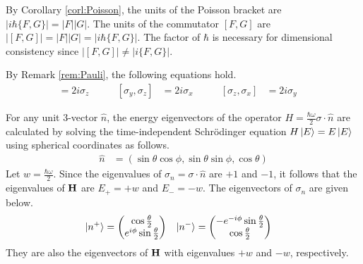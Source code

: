 \begin{answer}
	By Corollary \ref{corl:Poisson}, the units of the Poisson bracket are $\left|i \hbar \{F, G\}\right| = \left|F\right| \left|G\right|$.
	The units of the commutator $\left[F, G\right]$ are $\left|[F, G]\right| = |F| |G| = \left|i \hbar \{F, G\}\right|$.
	The factor of $\hbar$ is necessary for dimensional consistency since $\left|[F,G]\right| \neq \left|i \{F, G\}\right|$.
\end{answer}

\begin{answer}
	By Remark \ref{rem:Pauli}, the following equations hold.
	\begin{align*}
		[\sigma_x, \sigma_y] & = 2 i \sigma_z \qquad
		                     &
		[\sigma_y, \sigma_z] & = 2 i \sigma_x \qquad
		                     &
		[\sigma_z, \sigma_x] & = 2 i \sigma_y \qquad
	\end{align*}
\end{answer}

\begin{answer}
	For any unit $3$-vector $\hat{n}$, the energy eigenvectors of the operator $H = \frac{\hbar \omega}{2} \sigma \cdot \hat{n}$ are calculated by solving the time-independent Schr\"{o}dinger equation $H \ket{E} = E \ket{E}$ using spherical coordinates as follows.
	\begin{align}
		\hat{n} & = \left(\sin \theta \cos \phi, \sin \theta \sin \phi, \cos \theta\right)
	\end{align}
	Let $w = \frac{\hbar \omega}{2}$.
	Since the eigenvalues of $\sigma_n = \sigma \cdot \hat{n}$ are $+1$ and $-1$, it follows that the eigenvalues of $\mathbf{H}$ are $E_+ = +w$ and $E_- = -w$.
	The eigenvectors of $\sigma_n$ are given below.
	\begin{align*}
		\ket{n^+} & =
		\begin{pmatrix}
			\cos \frac{\theta}{2} \\
			e^{i \phi} \sin \frac{\theta}{2}
		\end{pmatrix}
		          &
		\ket{n^-} & =
		\begin{pmatrix}
			- e^{-i \phi} \sin \frac{\theta}{2} \\
			\cos \frac{\theta}{2}
		\end{pmatrix}
	\end{align*}
	They are also the eigenvectors of $\mathbf{H}$ with eigenvalues $+w$ and $-w$, respectively.
\end{answer}

